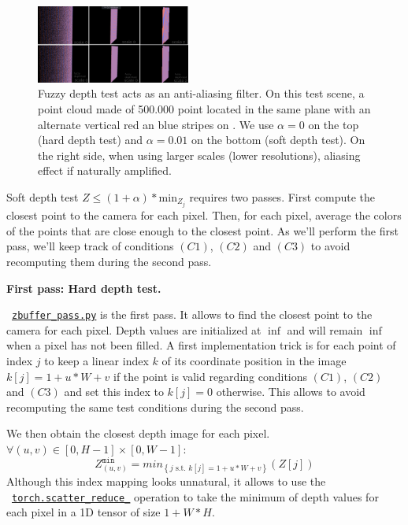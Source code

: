 \begin{figure}[H]
    \centering
    \includegraphics[width=0.45\textwidth]{figures/fuzzy_depth_test_aliasing_large.png}
    \caption{Fuzzy depth test acts as an anti-aliasing filter. On this test scene, a point cloud made of 500.000 point located in the same plane with an alternate vertical red an blue stripes on . We use $\alpha=0$ on the top (hard depth test) and $\alpha=0.01$ on the bottom (soft depth test). On the right side, when using larger scales (lower resolutions), aliasing effect if naturally amplified.}
    \label{fig:fuzzy_depth_test_AA}
\end{figure}

Soft depth test $Z \leq (1 + \alpha) * \textrm{min}_{Z_{j}}$ requires two passes. First compute the closest point to the camera for each pixel. Then, for each pixel, average the colors of the points that are close enough to the closest point. As we'll perform the first pass, we'll keep track of conditions $(C1)$, $(C2)$ and $(C3)$ to avoid recomputing them during the second pass.

\noindent \textbf{First pass: Hard depth test.}

\noindent ~\href{https://github.com/balthazarneveu/per-pixel-point-rendering/blob/main/src/pixr/rendering/zbuffer\_pass.py#L5}{\texttt{zbuffer\_pass.py}} is the first pass. It allows to find the closest point to the camera for each pixel. Depth values are initialized at $\inf$ and will remain $\inf$ when a pixel has not been filled. A first implementation trick is for each point of index $j$ to keep a linear index $k$ of its coordinate position in the image $k[j] = 1+ u*W+v$ if the point is valid regarding conditions $(C1)$, $(C2)$ and $(C3)$ and set this index to $k[j]=0$ otherwise. This allows to avoid recomputing the same test conditions during the second pass.

We then obtain the closest depth image for each pixel. $\forall (u,v) \in \left[0, H-1\right] \times \left[0, W-1\right]$:
$$Z^{\texttt{min}}_{(u,v)} = min_{\left\{j  \text{ s.t. } k[j]=1+u*W+v\right\}} \left(Z[j]\right)$$
\noindent Although this index mapping looks unnatural, it allows to use the ~\href{https://pytorch.org/docs/stable/generated/torch.Tensor.scatter\_reduce\_.html#torch.Tensor.scatter\_reduce\_}{\texttt{torch.scatter\_reduce\_}} operation to take the minimum of depth values for each pixel in a 1D tensor of size $1+W*H$.

